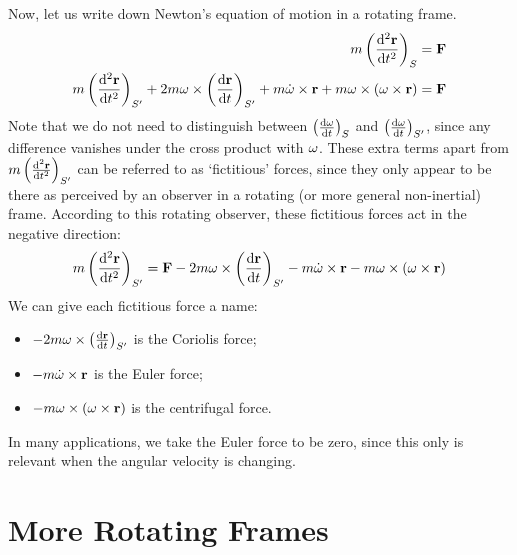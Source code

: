 \documentclass{article}
\begin{document}
Now, let us write down Newton's equation of motion in a rotating frame.
\begin{align*}
    m\left( \dv[2]{\vb r}{t} \right)_S                                                                                                                                          & = \vb F \\
    m\left( \dv[2]{\vb r}{t} \right)_{S'} + 2 m\vb\omega \times \left( \dv{\vb r}{t} \right)_{S'} + m\dot{\vb\omega} \times \vb r + m\vb\omega \times (\vb \omega \times \vb r) & = \vb F \\
\end{align*}
Note that we do not need to distinguish between $\left( \dv{\vb\omega}{t} \right)_S$ and $\left( \dv{\vb\omega}{t} \right)_{S'}$, since any difference vanishes under the cross product with $\vb\omega$. These extra terms apart from $m\left( \dv[2]{\vb r}{t} \right)_{S'}$ can be referred to as `fictitious' forces, since they only appear to be there as perceived by an observer in a rotating (or more general non-inertial) frame. According to this rotating observer, these fictitious forces act in the negative direction:
\[ m\left( \dv[2]{\vb r}{t} \right)_{S'} = \vb F - 2 m\vb\omega \times \left( \dv{\vb r}{t} \right)_{S'} - m\dot{\vb\omega} \times \vb r - m\vb\omega \times (\vb \omega \times \vb r) \]
We can give each fictitious force a name:
\begin{itemize}
    \item $-2 m\vb\omega \times \left( \dv{\vb r}{t} \right)_{S'}$ is the Coriolis force;
    \item $-m\dot{\vb\omega} \times \vb r$ is the Euler force;
    \item $-m\vb\omega \times (\vb \omega \times \vb r)$ is the centrifugal force.
\end{itemize}
In many applications, we take the Euler force to be zero, since this only is relevant when the angular velocity is changing.

\section{More Rotating Frames}
\end{document}
